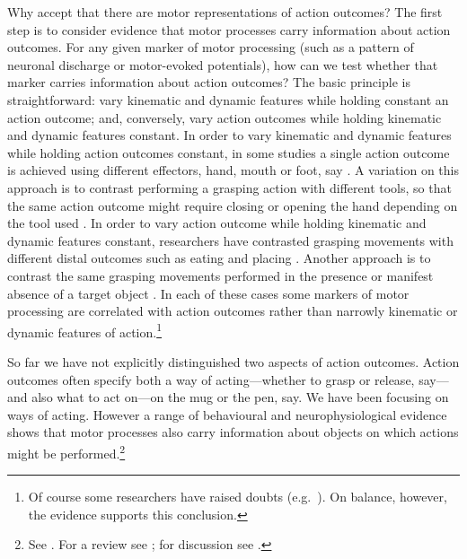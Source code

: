 \documentclass[12pt,\papersize]{extarticle}
\begin{document}
Why accept that there are motor representations of action outcomes? The first step is to consider evidence that motor processes carry information about action outcomes. For any given marker of motor processing (such as a pattern of neuronal discharge or motor-evoked potentials), how can we test whether that marker carries information about action outcomes? The basic principle is straightforward: vary kinematic and dynamic features while holding constant an action outcome; and, conversely, vary action outcomes while holding kinematic and dynamic features constant. 
In order to vary kinematic and dynamic features while holding action outcomes constant, in some studies a single action outcome is achieved using different effectors, hand, mouth or foot, say \citep{rizzolatti:1988_functional,Rizzolatti:2001ug,cattaneo:2010_state-dependent}. A variation on this approach is to contrast performing a grasping action with different tools, so that the same action outcome might require closing or opening the hand depending on the tool used \citep{umilta:2008pliers,cattaneo:2009_representation,rochat:2010_responses}. In order to vary action outcome while holding kinematic and dynamic features constant, researchers have contrasted grasping movements with different distal outcomes such as eating and placing \citep{Fogassi:2005nf,bonini:2010_ventral,cattaneo:2007_impairment}. Another approach is to contrast the same grasping movements performed in the presence or manifest absence of a target object \citep{Umilta:2001zr,villiger:2010_activity}. 
In each of these cases some markers of motor processing are correlated with action outcomes rather than narrowly kinematic or dynamic features of action.\footnote{ Of course some researchers have raised doubts  (e.g.\ \citealp{cavallo_grasping_2011,borroni_mirroring_2011}).  On balance, however, the evidence supports this conclusion.}


So far we have not explicitly distinguished two aspects of action outcomes.  
Action outcomes often specify both a way of acting---whether to grasp or release, say---and also what to act on---on the mug or the pen, say.  
We have been focusing on ways of acting. 
 However a range of behavioural and neurophysiological evidence shows that motor processes also carry information about objects on which actions might be performed.\footnote{
See \citet{buccino:2009_broken,costantini:2010_where,cardellicchio:2011_space,Tucker:1998,tucker:2001_potentiation}.
For a review see \citet{Gallese:2011uq}; for discussion see \citet[pp.\ 410-3]{pacherie:2000_content}. 
}
\end{document}
